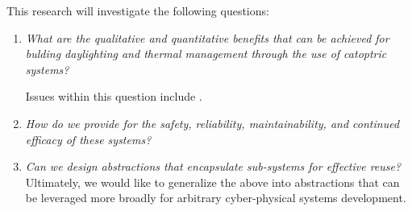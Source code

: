 

This research will investigate the following questions:
\begin{enumerate}

\item \emph{What are the qualitative and quantitative benefits
that can be achieved for bulding daylighting and thermal management
through the use of catoptric systems?}

Issues within this question include .

\item \emph{How do we provide for the safety, reliability, maintainability, and
continued efficacy of these systems?}

\item \emph{Can we design abstractions that encapsulate sub-systems for
effective reuse?}
Ultimately, we would like to generalize the above into abstractions that can be
leveraged more broadly for arbitrary cyber-physical systems development.

\end{enumerate}

